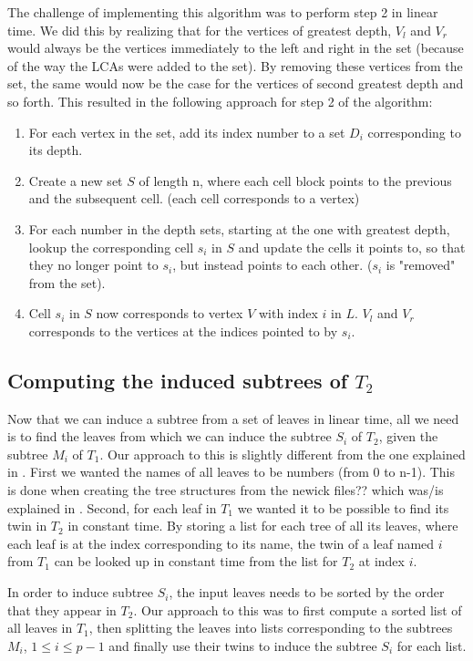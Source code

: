 The challenge of implementing this algorithm was to perform step 2 in linear time. We did this by realizing that for the vertices of greatest depth, $V_l$ and $V_r$ would always be the vertices immediately to the left and right in the set (because of the way the LCAs were added to the set). By removing these vertices from the set, the same would now be the case for the vertices of second greatest depth and so forth. This resulted in the following approach for step 2 of the algorithm:
\begin{enumerate}
	\item For each vertex in the set, add its index number to a set $D_i$ corresponding to its depth.
	\item Create a new set $S$ of length n, where each cell block points to the previous and the subsequent cell. (each cell corresponds to a vertex)
	\item For each number in the depth sets, starting at the one with greatest depth, lookup the corresponding cell $s_i$ in $S$ and update the cells it points to, so that they no longer point to $s_i$, but instead points to each other. ($s_i$ is "removed" from the set).
	\item Cell $s_i$ in $S$ now corresponds to vertex $V$ with index $i$ in $L$. $V_l$ and $V_r$ corresponds to the vertices at the indices pointed to by $s_i$.
\end{enumerate}

\subsection{Computing the induced subtrees of $T_2$}
Now that we can induce a subtree from a set of leaves in linear time, all we need is to find the leaves from which we can induce the subtree $S_i$ of $T_2$, given the subtree $M_i$ of $T_1$. Our approach to this is slightly different from the one explained in \cite{nlogn} . First we wanted the names of all leaves to be numbers (from 0 to n-1). This is done when creating the tree structures from the newick files?? which was/is explained in . Second, for each leaf in $T_1$ we wanted it to be possible to find its twin in $T_2$ in constant time. By storing a list for each tree of all its leaves, where each leaf is at the index corresponding to its name, the twin of a leaf named $i$ from $T_1$ can be looked up in constant time from the list for $T_2$ at index $i$.

In order to induce subtree $S_i$, the input leaves needs to be sorted by the order that they appear in $T_2$. Our approach to this was to first compute a sorted list of all leaves in $T_1$, then splitting the leaves into lists corresponding to the subtrees $M_i$, $1 \le i \le p-1$ and finally use their twins to induce the subtree $S_i$ for each list.

